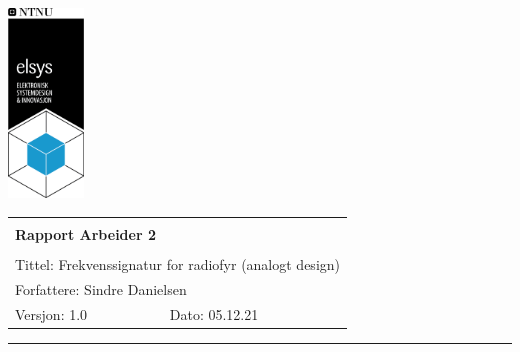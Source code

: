 \documentclass[a4paper,11pt,norsk]{article}
\begin{document}
\begin{minipage}[c]{0.15\textwidth}
\includegraphics[width=2.0cm]{elsys_pos_staaende_ntnu}  
\end{minipage}
\begin{minipage}[c]{0.85\textwidth}

\renewcommand{\arraystretch}{1.7}
\large 
\begin{tabularx}{\textwidth}{|X|X|}
\hline
\multicolumn{2}{|l|}{} \\
\multicolumn{2}{|l|}{\huge \textbf{Rapport Arbeider 2}} \\
\multicolumn{2}{|l|}{}  \\
\hline
\multicolumn{2}{|l|}{Tittel: 
Frekvenssignatur for radiofyr (analogt design)
} \\
\hline
\multicolumn{2}{|l|}{Forfattere: 
Sindre Danielsen
} \\
\hline
Versjon: 1.0 & Dato: 05.12.21
\\
\hline 
\end{tabularx}
\end{minipage}
\normalsize


\setlength{\parskip}{0ex}
\renewcommand{\baselinestretch}{0.1}\normalsize
\tableofcontents
\renewcommand{\baselinestretch}{1.00}\normalsize
\setlength{\parskip}{2ex}
\rule{\textwidth}{1pt}

\newpage
\end{document}
